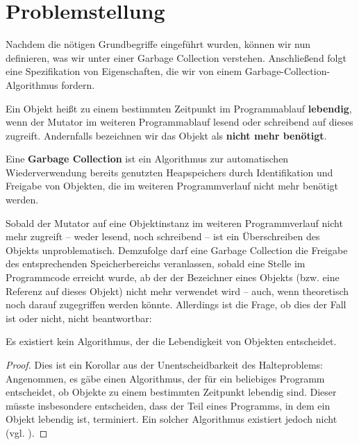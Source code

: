\section{Problemstellung}
\label{sec:intro:problem}
Nachdem die nötigen Grundbegriffe eingeführt wurden, können wir nun definieren, was wir unter einer Garbage Collection verstehen.
Anschließend folgt eine Spezifikation von Eigenschaften, die wir von einem Garbage-Collection-Algorithmus fordern.

\begin{mybox}
\begin{defn}[Lebendigkeit]
	\label{def:liveness}
	Ein Objekt heißt zu einem bestimmten Zeitpunkt im Programmablauf \textbf{lebendig}, wenn der Mutator im weiteren Programmablauf lesend oder schreibend auf dieses zugreift.
	Andernfalls bezeichnen wir das Objekt als \textbf{nicht mehr benötigt}.
\end{defn}
\end{mybox}

\begin{mybox}
\begin{defn}
	\label{def:gc}
	Eine \textbf{Garbage Collection} ist ein Algorithmus zur automatischen Wiederverwendung bereits genutzten Heapspeichers durch Identifikation und Freigabe von Objekten, die im weiteren Programmverlauf nicht mehr benötigt werden.
\end{defn}
\end{mybox}

Sobald der Mutator auf eine Objektinstanz im weiteren Programmverlauf nicht mehr zugreift -- weder lesend, noch schreibend -- ist ein Überschreiben des Objekts unproblematisch.
Demzufolge darf eine Garbage Collection die Freigabe des entsprechenden Speicherbereichs veranlassen, sobald eine Stelle im Programmcode erreicht wurde, ab der der Bezeichner eines Objekts (bzw. eine Referenz auf dieses Objekt) nicht mehr verwendet wird -- auch, wenn theoretisch noch darauf zugegriffen werden könnte.
Allerdings ist die Frage, ob dies der Fall ist oder nicht, nicht beantwortbar:

\begin{mybox}
\begin{satz}
	Es existiert kein Algorithmus, der die Lebendigkeit von Objekten entscheidet.
\end{satz}
\end{mybox}

\begin{proof}
	Dies ist ein Korollar aus der Unentscheidbarkeit des Halteproblems:
	Angenommen, es gäbe einen Algorithmus, der für ein beliebiges Programm entscheidet, ob Objekte zu einem bestimmten Zeitpunkt lebendig sind.
	Dieser müsste insbesondere entscheiden, dass der Teil eines Programms, in dem ein Objekt lebendig ist, terminiert.
	Ein solcher Algorithmus existiert jedoch nicht (vgl. \cite[Kap. 4.2]{sipser}).
\end{proof}

